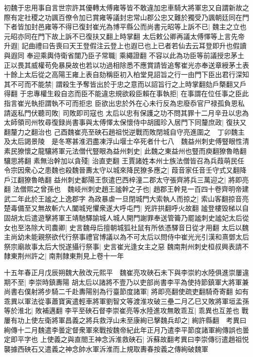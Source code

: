 初魏于忠用事自言世宗許其優轉太傅雍等皆不敢違加忠車騎大將軍忠又自謂新故之際有定社稷之功諷百僚令加已賞雍等議封忠常山郡公忠又難於獨受乃諷朝廷同在門下者皆加封邑雍等不得已復封崔光為博平縣公而尚書元昭等上訴不已|{
	魏主之立也元昭亦同在門下故上訴不已復扶又翻上時掌翻}
太后敕公卿再議太傅懌等上言先帝升遐|{
	記曲禮曰告喪曰天王登假注云登上也遐已也上已者若仙去云耳登即升也假讀與遐同}
奉迎乘輿侍衛省闥乃臣子常職|{
	乘繩證翻}
不容以此為功臣等前議授忠茅土正以畏其威權苟免暴戾故也若以功過相除悉不應賞請皆追奪崔光亦奉送章綬茅土表十餘上太后從之高陽王雍上表自劾稱臣初入柏堂見詔旨之行一由門下臣出君行深知其不可而不能禁|{
	謂殺生予奪皆出於于忠之意而以詔旨行之上時掌翻劾戶槩翻又戶得翻}
于忠專權生殺自恣而臣不能違忠規欲殺臣賴在事執拒|{
	在事謂在位任事之臣此指言崔光執拒謂執不可而拒忠}
臣欲出忠於外在心未行反為忠廢忝官尸禄孤負恩私請返私門伏聽司敗|{
	司敗即司寇也}
太后以忠有保護之功不問其罪十二月辛丑以忠為太師領司州牧尋復録尚書事與太傅懌太保懷侍中胡國珍入居門下同釐庶政|{
	復扶又翻釐力之翻治也}
己酉魏崔亮至硤石趙祖悦逆戰而敗閉城自守亮進圍之　丁卯魏主及太后謁景陵　是冬寒甚淮泗盡凍浮山堰士卒死者什七八　魏益州刺史傅豎眼性清素民獠懷之龍驤將軍元法僧代豎眼為益州刺史|{
	此魏之東益州也豎而庾翻獠魯皓翻驤思將翻}
素無治幹加以貪殘|{
	治直吏翻}
王賈諸姓本州士族法僧皆召為兵葭萌民任令宗因衆心之患魏也殺魏晉夀太守以城來降民獠多應之|{
	葭音家任音壬守式又翻降戶江翻獠魯皓翻}
益州刺史鄱陽王恢遣巴西梓潼二郡太守張齊將兵三萬迎之|{
	將即亮翻}
法僧熙之曾孫也　魏岐州刺史趙王謐幹之子也|{
	趙郡王幹見一百四十卷齊明帝建武二年此於王謐之上逸郡字}
為政暴虐一旦閉城門大索執人而掠之|{
	索山客翻掠音亮}
楚毒備至又無故斬六人闔城兇懼衆遂大呼屯門|{
	兇許拱翻呼火故翻}
謐登樓毁梯以自固胡太后遣遊擊將軍王靖馳驛諭城人城人開門謝罪奉送管籥乃罷謐刺史謐妃太后從女也至洛除大司農卿|{
	史言魏母后擅朝城狐社鼠有所依憑驛音日從才用翻}
太后以魏主尚幼未能親祭欲代行祭事禮官博議以為不可太后以問侍中崔光光引漢和熹鄧太后祭宗廟故事太后大悦遂攝行祭事|{
	史言崔光逢女主之惡}
魏南荆州刺史桓叔興表請不隸東荆州許之|{
	南荆隸東荆見上卷十一年}


十五年春正月戊辰朔魏大赦改元熙平　魏崔亮攻硤石未下與李崇約水陸俱進崇屢違期不至|{
	李崇時鎮夀陽}
胡太后以諸將不壹乃以吏部尚書李平為使持節鎮軍大將軍兼尚書右僕射將步騎二千赴夀陽别為行臺節度諸軍|{
	將即亮翻使疏吏翻騎奇寄翻}
如有乖異以軍法從事蕭寶寅遣輕車將軍劉智文等渡淮攻破三壘二月乙巳又敗將軍垣孟孫等於淮北|{
	敗補邁翻}
李平至硤石督李崇崔亮等水陸進攻無敢乖互|{
	乖異也互差也}
戰屢有功上使左衛將軍昌義之將兵救浮山未至康絢已擊魏兵却之|{
	絢許縣翻　考異曰絢傳十二月魏遣李曇定督衆軍來戰按魏帝紀此年正月乃遣李平節度諸軍絢傳誤也曇定即平字也}
上使義之與直閤王神念泝淮救硤石|{
	泝蘇故翻考異曰李崇傳衍遣趙祖悦襲據西硤石又遣義之神念帥水軍泝淮而上規取夀春按義之傳絢破魏軍}


